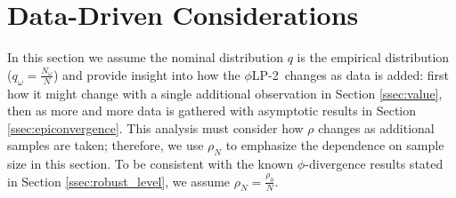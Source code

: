 \documentclass[12pt]{article}
\renewcommand{\P}{\mathbb{P}}
\newcommand{\p}[1]{\P \left[ #1 \right]}
\theoremstyle{plain}
\theoremstyle{definition}
\theoremstyle{remark}
\newcommand{\plp}{$\phi$LP-2}
\begin{document}

\section{Data-Driven Considerations}
\label{sec:properties}

In this section we assume the nominal distribution $q$ is the empirical distribution ($q_\omega = \tfrac{N_\omega}{N}$) and provide insight into how the \plp\ changes as data is added: first how it might change with a single additional observation in Section \ref{ssec:value}, then as more and more data is gathered with asymptotic results in Section \ref{ssec:epiconvergence}.
This analysis must consider how $\rho$ changes as additional samples are taken; therefore, we use $\rho_N$ to emphasize the dependence on sample size in this section.
To be consistent with the known $\phi$-divergence results stated in Section \ref{ssec:robust_level}, we assume $\rho_N = \frac{\rho_0}{N}$.
\end{document}
